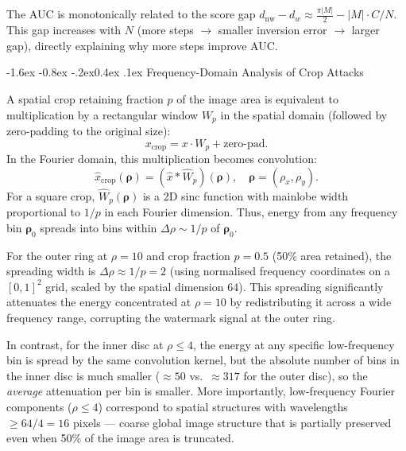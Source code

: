 \documentclass[10pt,twocolumn]{article}
\makeatletter
\renewcommand\subsection{\@startsection{subsection}{2}{\z@}%
  {-1.6ex \@plus -0.8ex \@minus -.2ex}{0.4ex \@plus .1ex}%
  {\normalfont\normalsize\itshape}}
\makeatother
\begin{document}
The AUC is monotonically related to the score gap
$d_{\mathrm{nw}} - d_w \approx \frac{\pi|M|}{2} - |M| \cdot C/N$.
This gap increases with $N$ (more steps $\to$ smaller inversion error
$\to$ larger gap), directly explaining why more steps improve AUC.

\subsection{Frequency-Domain Analysis of Crop Attacks}

A spatial crop retaining fraction $p$ of the image area is equivalent
to multiplication by a rectangular window $W_p$ in the spatial domain
(followed by zero-padding to the original size):
\begin{equation}
  x_{\mathrm{crop}} = x \cdot W_p + \text{zero-pad}.
  \label{eq:crop_spatial}
\end{equation}
In the Fourier domain, this multiplication becomes convolution:
\begin{equation}
  \hat{x}_{\mathrm{crop}}(\boldsymbol{\rho})
    = (\hat{x} * \hat{W}_p)(\boldsymbol{\rho}),
  \quad \boldsymbol{\rho} = (\rho_x, \rho_y).
  \label{eq:crop_fourier}
\end{equation}
For a square crop, $\hat{W}_p(\boldsymbol{\rho})$ is a 2D sinc function
with mainlobe width proportional to $1/p$ in each Fourier dimension.
Thus, energy from any frequency bin $\boldsymbol{\rho}_0$ spreads into
bins within $\Delta\rho \sim 1/p$ of $\boldsymbol{\rho}_0$.

For the outer ring at $\rho = 10$ and crop fraction $p = 0.5$
(50\% area retained), the spreading width is
$\Delta\rho \approx 1/p = 2$ (using normalised frequency coordinates
on a $[0,1]^2$ grid, scaled by the spatial dimension 64).
This spreading significantly attenuates the energy concentrated at
$\rho = 10$ by redistributing it across a wide frequency range,
corrupting the watermark signal at the outer ring.

In contrast, for the inner disc at $\rho \le 4$, the energy at any
specific low-frequency bin is spread by the same convolution kernel,
but the absolute number of bins in the inner disc is much smaller
($\approx 50$ vs.\ $\approx 317$ for the outer disc),
so the \emph{average} attenuation per bin is smaller.
More importantly, low-frequency Fourier components ($\rho \le 4$)
correspond to spatial structures with wavelengths $\ge 64/4 = 16$
pixels --- coarse global image structure that is partially preserved
even when 50\% of the image area is truncated.
\end{document}
